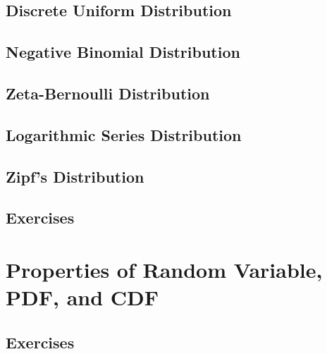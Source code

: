 \subsection{Discrete Uniform Distribution}
\subsection{Negative Binomial Distribution}
\subsection{Zeta-Bernoulli Distribution}
\subsection{Logarithmic Series Distribution}
\subsection{Zipf's Distribution}

\subsection{Exercises}

\section{Properties of Random Variable, PDF, and CDF}
\subsection{Exercises}



